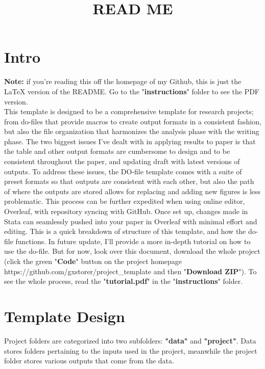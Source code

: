 \documentclass[12pt]{article}
\title{READ ME}
\begin{document}
\maketitle

\section{Intro}

\textbf{Note:} if you're reading this off the homepage of my Github, this is just the LaTeX version of the README. Go to the "\textbf{instructions}" folder to see the PDF version. \\

This template is designed to be a comprehensive template for research projects; from do-files that provide macros to create output formats in a consistent fashion, but also the file organization that harmonizes the analysis phase with the writing phase. The two biggest issues I've dealt with in applying results to paper is that the table and other output formats are cumbersome to design and to be consistent throughout the paper, and updating draft with latest versions of outputs. To address these issues, the DO-file template comes with a suite of preset formats so that outputs are consistent with each other, but also the path of where the outputs are stored allows for replacing and adding new figures is less problematic. This process can be further expedited when using online editor, Overleaf, with repository syncing with GitHub. Once set up, changes made in Stata can seamlessly pushed into your paper in Overleaf with minimal effort and editing. This is a quick breakdown of structure of this template, and how the do-file functions. In future update, I'll provide a more in-depth tutorial on how to use the do-file. But for now, look over this document, download the whole project (click the green "\textbf{Code}" button on the project homepage https://github.com/gxstorer/project\_template and then "\textbf{Download ZIP}"). To see the whole process, read the "\textbf{tutorial.pdf}" in the "\textbf{instructions}" folder.

\section{Template Design}
Project folders are categorized into two subfolders: \textbf{"data"} and \textbf{"project"}. Data stores folders pertaining to the inputs used in the project, meanwhile the project folder stores various outputs that come from the data.
\end{document}
